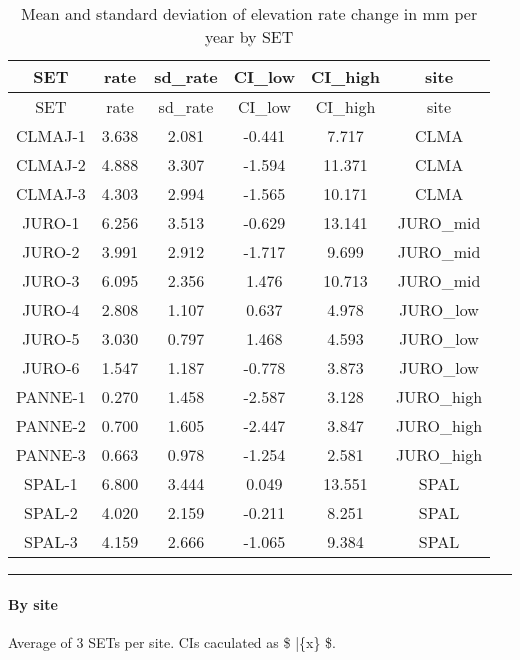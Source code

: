 \documentclass[]{article}
\let\oldparagraph\paragraph
\renewcommand{\paragraph}[1]{\oldparagraph{#1}\mbox{}}
\begin{document}
\begin{longtable}[]{@{}cccccc@{}}
\caption{Mean and standard deviation of elevation rate change in mm per
year by SET}\tabularnewline
\toprule
SET & rate & sd\_rate & CI\_low & CI\_high & site\tabularnewline
\midrule
\endfirsthead
\toprule
SET & rate & sd\_rate & CI\_low & CI\_high & site\tabularnewline
\midrule
\endhead
CLMAJ-1 & 3.638 & 2.081 & -0.441 & 7.717 & CLMA\tabularnewline
CLMAJ-2 & 4.888 & 3.307 & -1.594 & 11.371 & CLMA\tabularnewline
CLMAJ-3 & 4.303 & 2.994 & -1.565 & 10.171 & CLMA\tabularnewline
JURO-1 & 6.256 & 3.513 & -0.629 & 13.141 & JURO\_mid\tabularnewline
JURO-2 & 3.991 & 2.912 & -1.717 & 9.699 & JURO\_mid\tabularnewline
JURO-3 & 6.095 & 2.356 & 1.476 & 10.713 & JURO\_mid\tabularnewline
JURO-4 & 2.808 & 1.107 & 0.637 & 4.978 & JURO\_low\tabularnewline
JURO-5 & 3.030 & 0.797 & 1.468 & 4.593 & JURO\_low\tabularnewline
JURO-6 & 1.547 & 1.187 & -0.778 & 3.873 & JURO\_low\tabularnewline
PANNE-1 & 0.270 & 1.458 & -2.587 & 3.128 & JURO\_high\tabularnewline
PANNE-2 & 0.700 & 1.605 & -2.447 & 3.847 & JURO\_high\tabularnewline
PANNE-3 & 0.663 & 0.978 & -1.254 & 2.581 & JURO\_high\tabularnewline
SPAL-1 & 6.800 & 3.444 & 0.049 & 13.551 & SPAL\tabularnewline
SPAL-2 & 4.020 & 2.159 & -0.211 & 8.251 & SPAL\tabularnewline
SPAL-3 & 4.159 & 2.666 & -1.065 & 9.384 & SPAL\tabularnewline
\bottomrule
\end{longtable}

\begin{center}\rule{0.5\linewidth}{\linethickness}\end{center}

\paragraph{By site}\label{by-site}

Average of 3 SETs per site. CIs caculated as \$ \bar\{x\}
\sigma\$.
\end{document}
